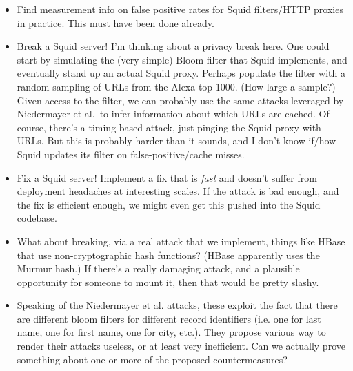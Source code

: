 \begin{itemize}
\item Find measurement info on false positive rates for Squid filters/HTTP proxies in practice.  This must have been done already.

\item Break a Squid server!  I'm thinking about a privacy break here.  One could start by simulating the (very simple) Bloom filter that Squid implements, and eventually stand up an actual Squid proxy.  Perhaps populate the filter with a random sampling of URLs from the Alexa top 1000.  (How large a sample?)  Given access to the filter, we can probably use the same attacks leveraged by Niedermayer et al.\ to infer information about which URLs are cached.  Of course, there's a timing based attack, just pinging the Squid proxy with URLs.   But this is probably harder than it sounds, and I don't know if/how Squid updates its filter on false-positive/cache misses.  

\item Fix a Squid server!  Implement a fix that is \emph{fast} and doesn't suffer from deployment headaches at interesting scales.  If the attack is bad enough, and the fix is efficient enough, we might even get this pushed into the Squid codebase. 

\item What about breaking, via a real attack that we implement, things like HBase that use non-cryptographic hash functions?  (HBase apparently uses the Murmur hash.)  If there's a really damaging attack, and a plausible opportunity for someone to mount it, then that would be pretty slashy.

\item Speaking of the Niedermayer et al. attacks, these exploit the fact that there are different bloom filters for different record identifiers (i.e. one for last name, one for first name, one for city, etc.).  They propose various way to render their attacks useless, or at least very inefficient.  Can we actually prove something about one or more of the proposed countermeasures?


\end{itemize}
